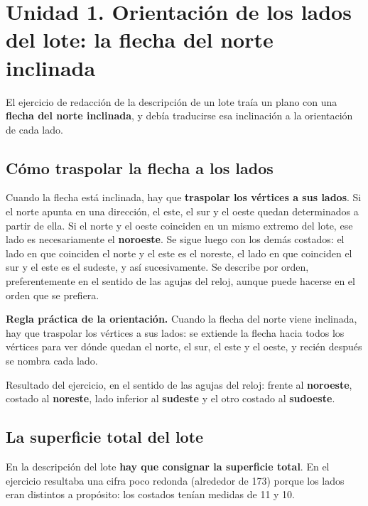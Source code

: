 \documentclass[12pt,oneside,a4paper]{book}
\begin{document}
\section{Unidad 1. Orientación de los lados del lote: la flecha del norte inclinada}

El ejercicio de redacción de la descripción de un lote traía un plano con una \textbf{flecha del norte inclinada}, y debía traducirse esa inclinación a la orientación de cada lado.

\subsection{Cómo traspolar la flecha a los lados}

Cuando la flecha está inclinada, hay que \textbf{traspolar los vértices a sus lados}. Si el norte apunta en una dirección, el este, el sur y el oeste quedan determinados a partir de ella. Si el norte y el oeste coinciden en un mismo extremo del lote, ese lado es necesariamente el \textbf{noroeste}. Se sigue luego con los demás costados: el lado en que coinciden el norte y el este es el noreste, el lado en que coinciden el sur y el este es el sudeste, y así sucesivamente. Se describe por orden, preferentemente en el sentido de las agujas del reloj, aunque puede hacerse en el orden que se prefiera.

\begin{important}
\textbf{Regla práctica de la orientación.} Cuando la flecha del norte viene inclinada, hay que traspolar los vértices a sus lados: se extiende la flecha hacia todos los vértices para ver dónde quedan el norte, el sur, el este y el oeste, y recién después se nombra cada lado.

Resultado del ejercicio, en el sentido de las agujas del reloj: frente al \textbf{noroeste}, costado al \textbf{noreste}, lado inferior al \textbf{sudeste} y el otro costado al \textbf{sudoeste}.
\end{important}

\subsection{La superficie total del lote}

En la descripción del lote \textbf{hay que consignar la superficie total}. En el ejercicio resultaba una cifra poco redonda (alrededor de 173) porque los lados eran distintos a propósito: los costados tenían medidas de 11 y 10.
\end{document}
